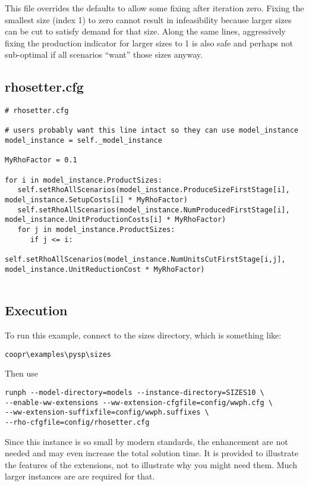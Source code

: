 This file overrides the defaults to allow some fixing after iteration zero.
Fixing the smallest size (index 1) to zero cannot result in infeasibility
because larger sizes can be cut to satisfy demand for that size. Along the same
lines, aggressively fixing the production indicator for larger sizes to 1 is
also safe and perhaps not sub-optimal if all scenarios ``want'' those sizes
anyway.

\subsection{rhosetter.cfg}

\begin{verbatim}
# rhosetter.cfg

# users probably want this line intact so they can use model_instance
model_instance = self._model_instance

MyRhoFactor = 0.1

for i in model_instance.ProductSizes:
   self.setRhoAllScenarios(model_instance.ProduceSizeFirstStage[i], model_instance.SetupCosts[i] * MyRhoFactor)
   self.setRhoAllScenarios(model_instance.NumProducedFirstStage[i], model_instance.UnitProductionCosts[i] * MyRhoFactor)
   for j in model_instance.ProductSizes:
      if j <= i:
         self.setRhoAllScenarios(model_instance.NumUnitsCutFirstStage[i,j], model_instance.UnitReductionCost * MyRhoFactor)


\end{verbatim}

\subsection{Execution}

To run this example, connect to the sizes directory, which is something like:
\begin{verbatim}
coopr\examples\pysp\sizes
\end{verbatim}

Then use
\begin{verbatim}
runph --model-directory=models --instance-directory=SIZES10 \
--enable-ww-extensions --ww-extension-cfgfile=config/wwph.cfg \
--ww-extension-suffixfile=config/wwph.suffixes \
--rho-cfgfile=config/rhosetter.cfg
\end{verbatim}

Since this instance is so small by modern standards, the enhancement are not
needed and may even increase the total solution time. It is provided to
illustrate the features of the extensions, not to illustrate why you might need
them. Much larger instances are are required for that.

